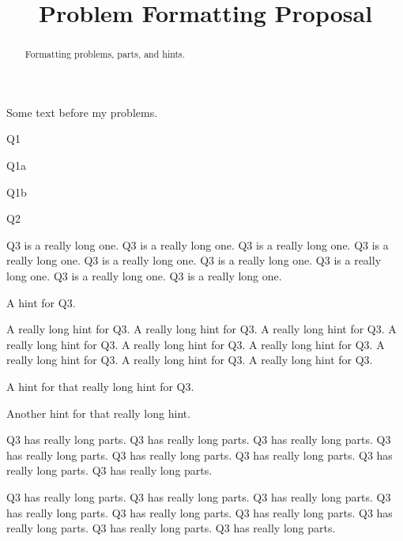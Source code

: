 \documentclass{ximera}
\title{Problem Formatting Proposal}
\begin{document}
\begin{abstract}
  Formatting problems, parts, and hints.
\end{abstract}

\maketitle

Some text before my problems.

\begin{problem}
	Q1
	\begin{parts}[hide]
		\item Q1a
		\item Q1b
	\end{parts}
\end{problem}

\begin{problem}
	Q2
\end{problem}

\begin{problem}
			Q3 is a really long one. Q3 is a really long one. Q3 is a really long one. Q3 is a really long one. Q3 is a really long one. Q3 is a really long one. Q3 is a really long one. Q3 is a really long one. Q3 is a really long one. 
	\begin{hints}
		\item A hint for Q3.
		\item A really long hint for Q3. A really long hint for Q3. A really long hint for Q3. A really long hint for Q3. A really long hint for Q3. A really long hint for Q3. A really long hint for Q3. A really long hint for Q3. A really long hint for Q3.
		\begin{hints}
			\item A hint for that really long hint for Q3.
		\end{hints}
		\begin{hints}
			\item Another hint for that really long hint.
		\end{hints}
	\end{hints}
	\begin{parts}
		\item Q3 has really long parts. Q3 has really long parts. Q3 has really long parts. Q3 has really long parts. Q3 has really long parts. Q3 has really long parts. Q3 has really long parts. Q3 has really long parts. 
		\item Q3 has really long parts. Q3 has really long parts. Q3 has really long parts. Q3 has really long parts. Q3 has really long parts. Q3 has really long parts. Q3 has really long parts. Q3 has really long parts. Q3 has really long parts. 
	\end{parts}
\end{problem}
\end{document}
